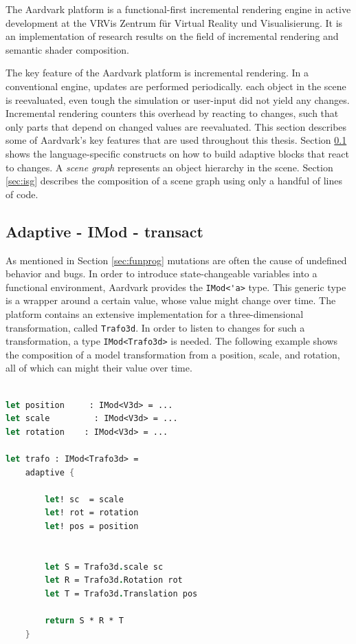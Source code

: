The Aardvark platform\cite{aardvark} is a functional-first incremental rendering engine in active development at the VRVis Zentrum für Virtual Reality und Visualisierung\cite{vrvis}. It is an implementation of research results on the field of incremental rendering \cite{worister2013lazy, haaser2015incremental} and semantic shader composition\cite{haaser2014cosmo, haaser2014semantic}. 

The key feature of the Aardvark platform is incremental rendering. In a conventional engine, updates are performed periodically. each object in the scene is reevaluated, even tough the simulation or user-input did not yield any changes. Incremental rendering counters this overhead by reacting to changes, such that only parts that depend on changed values are reevaluated. This section describes some of Aardvark's key features that are used throughout this thesis. Section \ref{sec:adaptive} shows the language-specific constructs on how to build adaptive blocks that react to changes. A \textit{scene graph} represents an object hierarchy in the scene. Section \ref{sec:isg} describes the composition of a scene graph using only a handful of lines of code. 

 
\subsection{Adaptive - IMod - transact}
\label{sec:adaptive}

As mentioned in Section \ref{sec:funprog} mutations are often the cause of undefined behavior and bugs. In order to introduce state-changeable variables into a functional environment, Aardvark provides the \verb|IMod<'a>| type. This generic type is a wrapper around a certain value, whose value might change over time. The platform contains an extensive implementation for a three-dimensional transformation, called \verb|Trafo3d|. In order to listen to changes for such a transformation, a type \verb|IMod<Trafo3d>| is needed. The following example shows the composition of a model transformation from a position, scale, and rotation, all of which can might their value over time. 

\begin{lstlisting}[language = FSharp]

let position     : IMod<V3d> = ... 
let scale         : IMod<V3d> = ... 
let rotation    : IMod<V3d> = ...

let trafo : IMod<Trafo3d> = 
    adaptive {
    
        let! sc  = scale
        let! rot = rotation
        let! pos = position
        
        
        let S = Trafo3d.scale sc
        let R = Trafo3d.Rotation rot
        let T = Trafo3d.Translation pos
        
        return S * R * T
    }
\end{lstlisting}

